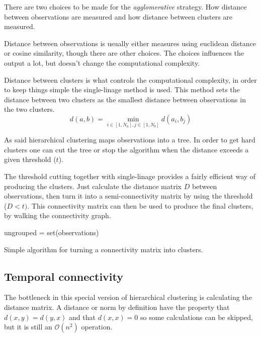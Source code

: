 There are two choices to be made for the \textit{agglomerative} strategy.  How distance between observations are measured and how distance between clusters are measured.

Distance between observations is usually either measures using euclidean distance or cosine similarity, though there are other choices. The choices influences the output a lot, but doesn't change the computational complexity.

Distance between clusters is what controls the computational complexity, in order to keep things simple the single-linage method is used. This method sets the distance between two clusters as the smallest distance between observations in the two clusters.
\begin{equation}
d(a, b) = \min_{i \in [1, N_a], j \in [1, N_b]} d(a_i, b_j)
\end{equation}

As said hierarchical clustering maps observations into a tree. In order to get hard clusters one can cut the tree or stop the algorithm when the distance exceeds a given threshold ($t$).

The threshold cutting together with single-linage provides a fairly efficient way of producing the clusters. Just calculate the distance matrix $D$ between observations, then turn it into a semi-connectivity matrix by using the threshold ($D < t)$. This connectivity matrix can then be used to produce the final clusters, by walking the connectivity graph.

\begin{algorithm}[h]
 \DontPrintSemicolon
 ungrouped = set(observations)\;
 \caption{Simple algorithm for turning a connectivity matrix into clusters.}
\end{algorithm}

\subsection{Temporal connectivity}

The bottleneck in this special version of hierarchical clustering is calculating the distance matrix. A distance or norm by definition have the property that $d(x,y) = d(y,x)$ and that $d(x,x) = 0$ so some calculations can be skipped, but it is still an $\mathcal{O}(n^2)$ operation.

